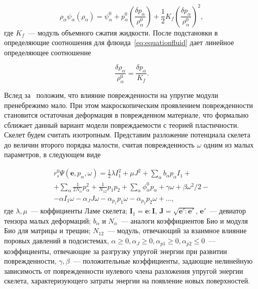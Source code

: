 \begin{equation}
  \label{eq:freeseries}
  \rho_{\alpha} \psi_{\alpha} (\rho_{\alpha}) = \psi_{\alpha}^0 + p_{\alpha}^0 \left( \frac{\delta p_{\alpha}}{\rho_{\alpha}^0}\right) + \frac{1}{2} K_f \left( \frac{\delta p_{\alpha}}{\rho_{\alpha}^0} \right)^2,
\end{equation}
где $K_f$~--- модуль объемного сжатия жидкости. После подстановки в определяющие соотношения для флюида~\eqref{eq:equationfluid} дает линейное определяющее соотношение

\begin{equation}
  \label{eq:equationfluidnext}
  \frac{\delta \rho_{\alpha}}{\rho_{\alpha}^0} = \frac{\delta p_{\alpha}}{K_f}.
\end{equation}

Вслед за~\autocite{kondaurov2007, izvekov2009, izvekov2010} положим, что влияние поврежденности на упругие модули пренебрежимо мало. При этом макроскопическим проявлением поврежденности становится остаточная деформация в поврежденном материале, что формально сближает данный вариант модели повреждаемости с теорией пластичности. Скелет будем считать изотропным. Представим разложение потенциала скелета до величин второго порядка малости, считая      поврежденность $\omega$ одним из малых параметров, в следующем виде

\begin{equation}
 \label{eq:skeletseries}
   \begin{multlined}
       r_s^0 \Psi({\textbf{e}}, p_{\alpha}, \omega) = \frac{1}{2}\lambda I_1^2 + \mu J^2 + \sum_{\alpha} b_{\alpha} p_{\alpha} I_1 + \\
       + \sum_{\alpha} \frac{1}{2 N_{\alpha} } p_{\alpha}^2+ \frac{1}{N_{12}} p_1 p_2 + \sum_{\alpha}\phi_{\alpha}^0 p_{\alpha} + \gamma \omega + \beta \omega^2/2 - \\
       - \alpha I_1 \omega - \alpha_J J \omega - \alpha_{p_1} p_1\omega - \alpha_{p_2} p_2 \omega + \dots,
   \end{multlined}
\end{equation}
где $\lambda, \mu$~--- коффициенты Ламе скелета; $\textbf{I}_1 = \textbf{e} : \textbf{I}$, $\textbf{J} = \sqrt{\textbf{e}' : \textbf{e}'}$, $\textbf{e}'$~--- девиатор тензора малых деформаций; $b_{\alpha}$ и $N_{\alpha}$~--- аналоги коэффициентов Био и модуля Био для матрицы и трещин; $N_{12}$~--- модуль, отвечающий за взаимное влияние поровых давлений в подсистемах, $\alpha \geq 0, \alpha_J \geq 0, \alpha_{p1} \geq 0, \alpha_{p2} \leq 0$~--- коэффициенты, отвечающие за разгрузку упругой энергии при развитии поврежденности, $\gamma, \beta$~--- положительные коэффициенты, задающие нелинейную зависимость от поврежденности нулевого члена разложения упругой энергии скелета, характеризующего затраты энергии на появление новых поверхностей.

